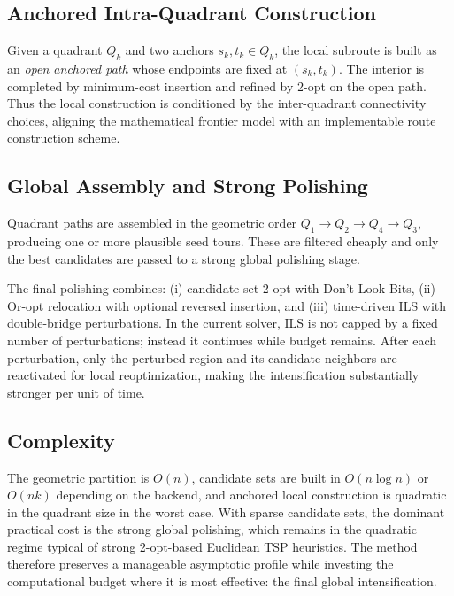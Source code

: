\documentclass[runningheads]{llncs}
\begin{document}
\subsection{Anchored Intra-Quadrant Construction}

Given a quadrant $Q_k$ and two anchors $s_k,t_k\in Q_k$, the local
subroute is built as an \emph{open anchored path} whose endpoints are
fixed at $(s_k,t_k)$. The interior is completed by minimum-cost
insertion and refined by 2-opt on the open path. Thus the local
construction is conditioned by the inter-quadrant connectivity choices,
aligning the mathematical frontier model with an implementable route
construction scheme.

\subsection{Global Assembly and Strong Polishing}

Quadrant paths are assembled in the geometric order
$Q_1\!\to\!Q_2\!\to\!Q_4\!\to\!Q_3$, producing one or more plausible
seed tours. These are filtered cheaply and only the best candidates are
passed to a strong global polishing stage.

The final polishing combines: (i) candidate-set 2-opt with
Don't-Look Bits, (ii) Or-opt relocation with optional reversed
insertion, and (iii) time-driven ILS with double-bridge perturbations.
In the current solver, ILS is not capped by a fixed number of
perturbations; instead it continues while budget remains. After each
perturbation, only the perturbed region and its candidate neighbors are
reactivated for local reoptimization, making the intensification
substantially stronger per unit of time.

\subsection{Complexity}

The geometric partition is $O(n)$, candidate sets are built in
$O(n\log n)$ or $O(nk)$ depending on the backend, and anchored local
construction is quadratic in the quadrant size in the worst case. With
sparse candidate sets, the dominant practical cost is the strong global
polishing, which remains in the quadratic regime typical of strong
2-opt-based Euclidean TSP heuristics. The method therefore preserves a
manageable asymptotic profile while investing the computational budget
where it is most effective: the final global intensification.
\end{document}
